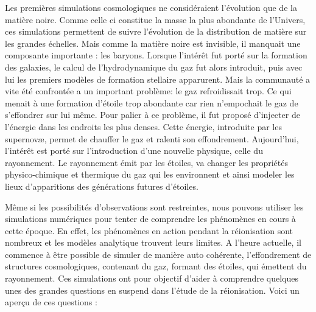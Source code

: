 Les premières simulations cosmologiques ne considéraient l'évolution que de la matière noire. %
Comme celle ci constitue la masse la plus abondante de l'Univers, ces simulations permettent de suivre l'évolution de la distribution de matière sur les grandes échelles. 
Mais comme la matière noire est invisible, il manquait une composante importante : les baryons.
Lorsque l'intérêt fut porté sur la formation des galaxies, le calcul de l'hydrodynamique du gaz fut alors introduit, puis avec lui les premiers modèles de formation stellaire apparurent.
Mais la communauté a vite été confrontée a un important problème: le gaz refroidissait trop.
Ce qui menait à une formation d'étoile trop abondante car rien n’empochait le gaz de s’effondrer sur lui même.
Pour palier à ce problème, il fut proposé d'injecter de l'énergie dans les endroits les plus denses.
Cette énergie, introduite par les supernovæ, permet de chauffer le gaz et ralenti son effondrement. 
Aujourd'hui, l'intérêt est porté sur l'introduction d'une nouvelle physique, celle du rayonnement.
Le rayonnement émit par les étoiles, va changer les propriétés physico-chimique et thermique du gaz qui les environnent et ainsi modeler les lieux d'apparitions des générations futures d'étoiles.

Même si les possibilités d'observations sont restreintes, nous pouvons utiliser les simulations numériques pour tenter de comprendre les phénomènes en cours à cette époque.
En effet, les phénomènes en action pendant la réionisation sont nombreux et les modèles analytique trouvent leurs limites.
A l'heure actuelle, il commence à être possible de simuler de manière auto cohérente, l'effondrement de structures cosmologiques, contenant du gaz, formant des étoiles, qui émettent du rayonnement.
Ces simulations ont pour objectif d'aider à comprendre quelques unes des grandes questions en suspend dans l'étude de la réionisation.
Voici un aperçu de ces questions : 

